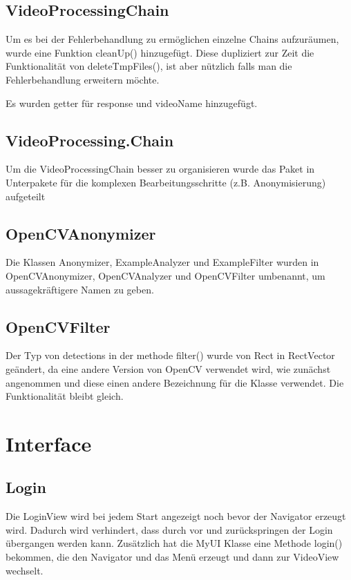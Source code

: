 \subsection{VideoProcessingChain}
Um es bei der Fehlerbehandlung zu ermöglichen einzelne Chains aufzuräumen, wurde eine Funktion cleanUp() hinzugefügt. Diese dupliziert zur Zeit die Funktionalität von deleteTmpFiles(), ist aber nützlich falls man die Fehlerbehandlung erweitern möchte. \par 
Es wurden getter für response und videoName hinzugefügt.

\subsection{VideoProcessing.Chain}
Um die VideoProcessingChain besser zu organisieren wurde das Paket in Unterpakete für die komplexen Bearbeitungsschritte (z.B. Anonymisierung) aufgeteilt

\subsection{OpenCVAnonymizer}
Die Klassen Anonymizer, ExampleAnalyzer und ExampleFilter wurden in OpenCVAnonymizer, OpenCVAnalyzer und OpenCVFilter umbenannt, um aussagekräftigere Namen zu geben.

\subsection{OpenCVFilter}
Der Typ von detections in der methode filter() wurde von Rect in RectVector geändert, da eine andere Version von OpenCV verwendet wird, wie zunächst angenommen und diese einen andere Bezeichnung für die Klasse verwendet. Die Funktionalität bleibt gleich.

\section{Interface}

\subsection{Login}
Die LoginView wird bei jedem Start angezeigt noch bevor der Navigator erzeugt wird. Dadurch wird verhindert, dass durch vor und zurückspringen der Login übergangen werden kann. Zusätzlich hat die MyUI Klasse eine Methode login() bekommen, die den Navigator und das Menü erzeugt und dann zur VideoView wechselt.

